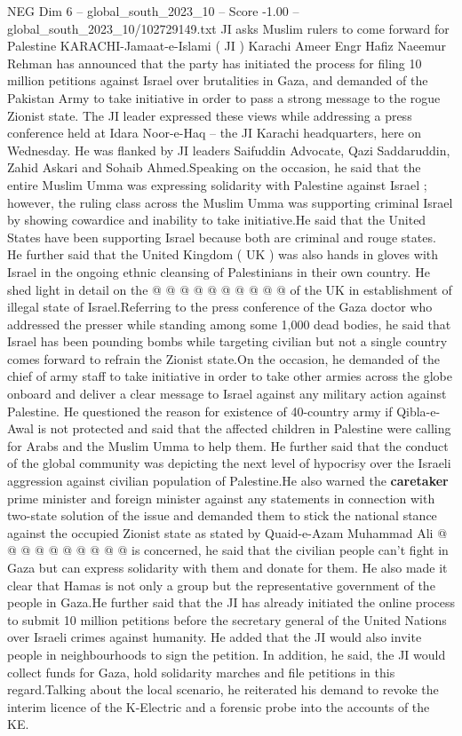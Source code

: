 \begin{textsample}{NEG Dim 6 – global\_south\_2023\_10 – Score -1.00 – global\_south\_2023\_10/102729149.txt}  \label{ex:f6_neg_154}
JI asks Muslim rulers to come forward for Palestine KARACHI-Jamaat-e-Islami ( JI ) Karachi Ameer Engr Hafiz Naeemur Rehman has announced that the party has initiated the process for filing 10 million petitions against Israel over brutalities in Gaza, and demanded of the Pakistan Army to take initiative in order to pass a strong message to the rogue Zionist state.
The JI leader expressed these views while addressing a press conference held at Idara Noor-e-Haq -- the JI Karachi headquarters, here on Wednesday.
He was flanked by JI leaders Saifuddin Advocate, Qazi Saddaruddin, Zahid Askari and Sohaib Ahmed.Speaking on the occasion, he said that the entire Muslim Umma was expressing solidarity with Palestine against Israel ; however, the ruling class across the Muslim Umma was supporting criminal Israel by showing cowardice and inability to take initiative.He said that the United States have been supporting Israel because both are criminal and rouge states.
He further said that the United Kingdom ( UK ) was also hands in gloves with Israel in the ongoing ethnic cleansing of Palestinians in their own country.
He shed light in detail on the @ @ @ @ @ @ @ @ @ @ of the UK in establishment of illegal state of Israel.Referring to the press conference of the Gaza doctor who addressed the presser while standing among some 1,000 dead bodies, he said that Israel has been pounding bombs while targeting civilian but not a single country comes forward to refrain the Zionist state.On the occasion, he demanded of the chief of army staff to take initiative in order to take other armies across the globe onboard and deliver a clear message to Israel against any military action against Palestine.
He questioned the reason for existence of 40-country army if Qibla-e-Awal is not protected and said that the affected children in Palestine were calling for Arabs and the Muslim Umma to help them.
He further said that the conduct of the global community was depicting the next level of hypocrisy over the Israeli aggression against civilian population of Palestine.He also warned the \textbf{caretaker} prime minister and foreign minister against any statements in connection with two-state solution of the issue and demanded them to stick the national stance against the occupied Zionist state as stated by Quaid-e-Azam Muhammad Ali @ @ @ @ @ @ @ @ @ @ is concerned, he said that the civilian people can't fight in Gaza but can express solidarity with them and donate for them.
He also made it clear that Hamas is not only a group but the representative government of the people in Gaza.He further said that the JI has already initiated the online process to submit 10 million petitions before the secretary general of the United Nations over Israeli crimes against humanity.
He added that the JI would also invite people in neighbourhoods to sign the petition.
In addition, he said, the JI would collect funds for Gaza, hold solidarity marches and file petitions in this regard.Talking about the local scenario, he reiterated his demand to revoke the interim licence of the K-Electric and a forensic probe into the accounts of the KE.

\end{textsample}
